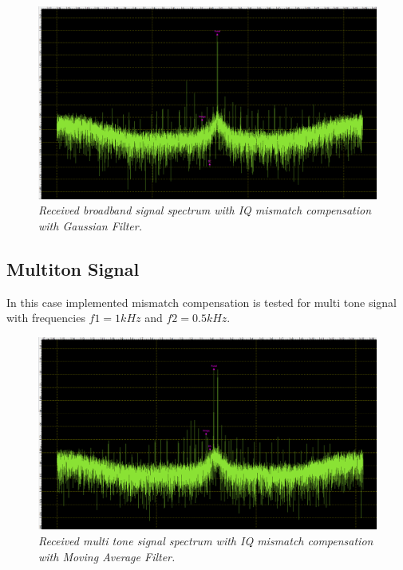 \documentclass[en,printmode]{mgr}
\begin{document}
   		\begin{figure}[!htb]
    		\centering
   			\includegraphics[width=\textwidth]{plots/my_single_gauss.png}
   		 	\caption{\textit{Received broadband signal spectrum with IQ mismatch compensation with
   		 	Gaussian Filter.}}
   		\end{figure}	
   		
   		\subsection*{Multiton Signal}
   		In this case implemented mismatch compensation is tested for
		multi tone signal with frequencies $f1=1kHz$ and $f2=0.5kHz$.
  		\begin{figure}[!htb]
    		\centering
   			\includegraphics[width=\textwidth]{plots/my_multi_mav.png}
   		 	\caption{\textit{Received multi tone signal spectrum with IQ mismatch compensation with
   		 	Moving Average Filter.}}
   		\end{figure}	
   		
\end{document}
